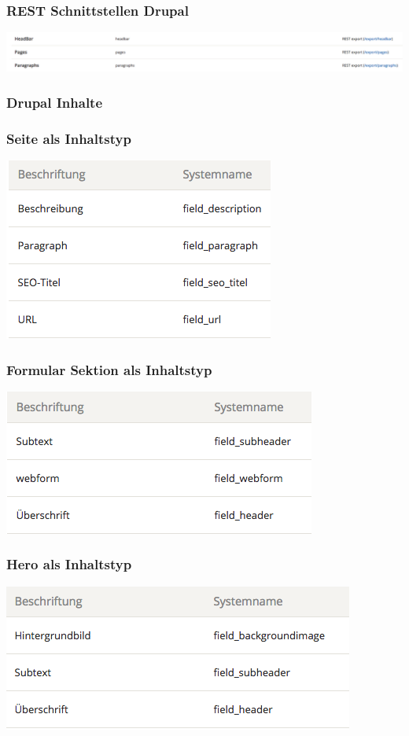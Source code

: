 \documentclass[11pt,a4paper]{article}
\begin{document}
\begin{appendices}
\subsubsection{REST Schnittstellen Drupal}
\label{sec:rest}
\includegraphics[width=16cm]{Rest}
\subsubsection{Drupal Inhalte}
\label{sec:content}
\subsubsection*{Seite als Inhaltstyp}
\includegraphics[scale=0.5]{Page}
\subsubsection*{Formular Sektion als Inhaltstyp}
\includegraphics[scale=0.5]{Form}
\subsubsection*{Hero als Inhaltstyp}
\includegraphics[scale=0.5]{Hero}

\end{appendices}
\end{document}
